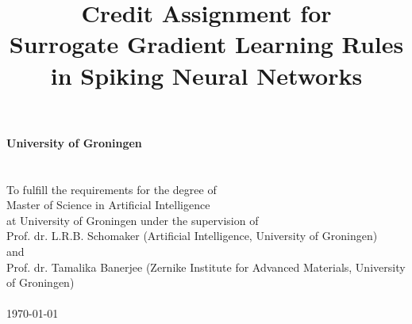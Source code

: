 \documentclass[a4paper,12pt,twoside]{article}
\begin{document}
\pagestyle{body}


\title{
    \vspace{5cm}
        {\bf
        {\Huge Credit Assignment for\\
        \vspace{2mm}Surrogate Gradient Learning Rules\\
        \vspace{4mm}in Spiking Neural Networks}
        }\\
        \vspace{10cm}{\LARGE Manvi Agarwal}
}
\date{}

\maketitle
\thispagestyle{titlepage}


\newpage

\thispagestyle{titlepage}

\vspace*{4cm}

\begin{center}
    {\bf{\large University of Groningen}}\\
    \\
    \vspace{2cm}{\bf Master's Thesis}\\
    \vspace{0.5cm}To fulfill the requirements for the degree of\\Master of Science in Artificial Intelligence\\
    at University of Groningen under the supervision of\\
    Prof. dr. L.R.B. Schomaker (Artificial Intelligence, University of Groningen)\\
    and\\
    Prof. dr. Tamalika Banerjee (Zernike Institute for Advanced Materials, University of Groningen)\\
    \vspace{3cm}{\bf Manvi Agarwal (s1234567)}\\
    \vspace{4cm}\today
    
\end{center}
\end{document}

